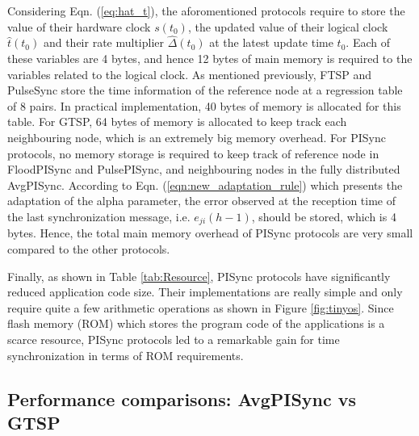 \documentclass[english,a4paper,10pt,final]{article}
\numberwithin{equation}{section}
\numberwithin{figure}{section}
\begin{document}
Considering Eqn. (\ref{eq:hat_t}), the aforomentioned protocols require to store the value of their hardware clock $s(t_0)$, the updated value of their logical clock $\hat{t}(t_0)$ and their rate multiplier $\hat{\Delta}(t_0)$ at the latest update time $t_0$. Each of these variables are 4 bytes, and hence 12 bytes of main memory is required to the variables related to the logical clock. As mentioned previously, FTSP and PulseSync store the time information of the reference node at a regression table of 8 pairs. In practical implementation, 40 bytes of memory is allocated for this table. For GTSP, 64 bytes of memory is allocated to keep track each neighbouring node, which is an extremely big memory overhead. For PISync protocols, no memory storage is required to keep track of reference node in FloodPISync and PulsePISync,  and neighbouring nodes in the fully distributed AvgPISync. According to Eqn. (\ref{eqn:new_adaptation_rule}) which presents the adaptation of the alpha parameter, the error observed at the reception time of the last synchronization message, i.e. $e_{ji}(h-1)$, should be stored, which is 4 bytes. Hence, the total main memory overhead of PISync protocols are very small compared to the other protocols.


Finally, as shown in Table \ref{tab:Resource}, PISync protocols have significantly reduced application code size. Their implementations are really simple and only require quite a few arithmetic operations as shown in Figure \ref{fig:tinyos}. Since flash memory (ROM) which stores the program code of the applications is a scarce resource, PISync protocols led to a remarkable gain for time synchronization in terms of ROM requirements. 






\subsection{ Performance comparisons: AvgPISync vs GTSP}\label{subsec:AvgPISync-GTSP}
\end{document}
